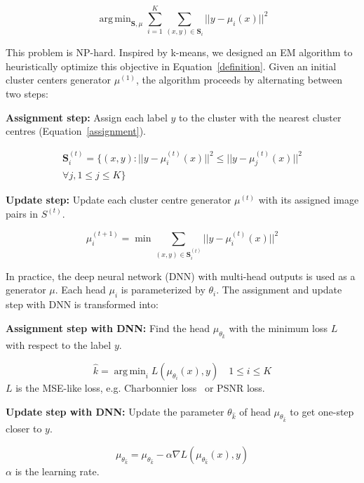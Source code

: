 \documentclass[letterpaper]{article} \usepackage{aaai23}  \usepackage{times}  \usepackage{helvet}  \usepackage{courier}  \usepackage[hyphens]{url}  \usepackage{graphicx} \urlstyle{rm} \def\UrlFont{\rm}  \usepackage{natbib}  \usepackage{caption} \frenchspacing  \setlength{\pdfpagewidth}{8.5in} \setlength{\pdfpageheight}{11in} \usepackage{algorithm}
\DeclareMathOperator*{\argmin}{arg\,min}
\begin{document}
\begin{equation}
    \label{definition}
    \argmin_{\mathbf{S}, \mu} \sum_{i=1}^K \sum_{(x,y)\in \mathbf{S}_i} ||y-\mu_i(x)||^2
\end{equation}

This problem is NP-hard. Inspired by k-means, we designed an EM algorithm to heuristically optimize this objective in Equation~\ref{definition}. Given an initial cluster centers generator $\mu^{(1)}$, the algorithm proceeds by alternating between two steps:

\textbf{Assignment step:} Assign each label $y$ to the cluster with the nearest cluster centres (Equation~\ref{assignment}).

\begin{multline}
    \label{assignment}
    \mathbf{S}_i^{(t)} = \{ (x,y): ||y-\mu^{(t)}_i(x)||^2\leq ||y-\mu^{(t)}_j(x)||^2   \\
     \forall j, 1\leq j\leq K \}
\end{multline}

\textbf{Update step:} Update each cluster centre generator $\mu^{(t)}$ with its assigned image pairs in ${S}^{(t)}$.

\begin{equation}
    \label{update}
\mu_i^{(t+1)} = \min \sum_{(x,y)\in \mathbf{S}_i^{(t)}} ||y-\mu_i^{(t)}(x)||^2
\end{equation}

In practice, the deep neural network (DNN) with multi-head outputs is used as a generator $\mu$. Each head $\mu_i$ is parameterized by $\theta_i$. The assignment and update step with DNN is transformed into:

\textbf{Assignment step with DNN:} Find the head $\mu_{\theta_{\hat{k}}}$ with the minimum loss $L$ with respect to the label $y$. 

\begin{equation}
    \label{assignment_nn}
    \hat{k} = \argmin_i L(\mu_{\theta_i}(x), y)\quad 1\leq i\leq K
\end{equation}
$L$ is the MSE-like loss, e.g. Charbonnier loss~\cite{charbonnier1994two} or PSNR loss.

\textbf{Update step with DNN:} Update the parameter $\theta_{\hat{k}}$ of head $\mu_{\theta_{\hat{k}}}$ to get one-step closer to $y$.

\begin{equation}
    \label{update_nn}
    \mu_{\theta_{\hat{k}}} = \mu_{\theta_{\hat{k}}} - \alpha\nabla L(\mu_{\theta_{\hat{k}}}(x), y)
\end{equation}
$\alpha$ is the learning rate.
\end{document}
